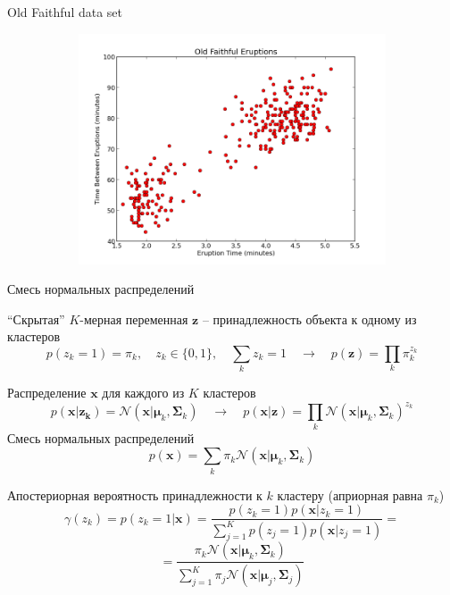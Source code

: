 \documentclass[aspectratio=169]{beamer}
\begin{document}
\begin{frame}{Old Faithful data set}
\begin{figure}
\begin{subfigure}[b]{0.5\textwidth}
                \includegraphics[width=\textwidth]{images/of2.png}
                \caption{}
        \end{subfigure}        
\end{figure}

\end{frame}

\begin{frame}{Смесь нормальных распределений}

``Скрытая'' $K$-мерная переменная $\mathbf{z}$ -- принадлежность объекта к одному из кластеров
\[
p(z_k = 1) = \pi_k, \quad z_k \in \{0, 1\}, \quad \sum_k z_k = 1 \quad\rightarrow\quad p(\mathbf{z}) = \prod_k \pi_k^{z_k}
\]

Распределение $\mathbf{x}$ для каждого из $K$ кластеров
\[
p(\mathbf{x} | \mathbf{z_k}) = \mathcal{N}(\mathbf{x} | \mathbf{\mu}_k, \mathbf{\Sigma}_k) \quad \rightarrow \quad p(\mathbf{x} | \mathbf{z}) = \prod_k \mathcal{N}(\mathbf{x} | \mathbf{\mu}_k, \mathbf{\Sigma}_k)^{z_k}
\]
Смесь нормальных распределений
\[
p(\mathbf{x}) = \sum_k \pi_k \mathcal{N}(\mathbf{x} | \mathbf{\mu}_k, \mathbf{\Sigma}_k)
\]

\end{frame}

\begin{frame}{}

Апостериорная вероятность принадлежности к $k$ кластеру (априорная равна $\pi_k$)
\[
\gamma(z_k) = p(z_k = 1 | \mathbf{x}) = \frac{p(z_k=1) p(\mathbf{x} | z_k = 1)}{\sum_{j=1}^K p(z_j=1) p(\mathbf{x} | z_j = 1)} =
\]
\[
= \frac{\pi_k \mathcal{N}(\mathbf{x} | \mathbf{\mu}_k, \mathbf{\Sigma}_k)}{\sum_{j=1}^K \pi_j \mathcal{N}(\mathbf{x} | \mathbf{\mu}_j, \mathbf{\Sigma}_j)}
\]

\end{frame}
\end{document}
